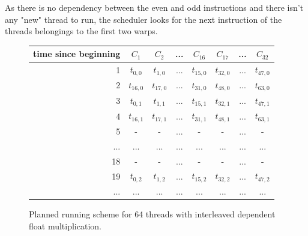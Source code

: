 \documentclass{report}
\begin{document}
As there is no dependency between the even and odd instructions and there isn't any "new" thread to run, the scheduler looks for the next instruction of the threads belongings to the first two warps.
\begin{figure}[H]
      \centering
       \begin{tabular}{ | r || c | c | c | c || c | c | c | }
    	    \hline
    	    time since beginning & $C_1$ & $C_2$ & ... & $C_{16}$ & $C_{17}$ & ... & $C_{32}$ \\ \hline  \hline
    	   1 & $t_{0,0}$ & $t_{1,0}$ & ... & $t_{15,0}$ & $t_{32, 0}$ & ... & $t_{47, 0}$ \\ \hline 
    	   2 & $t_{16,0}$ & $t_{17,0}$ & ... & $t_{31,0}$ & $t_{48, 0}$ & ... & $t_{63, 0}$ \\ \hline
    	   3 & $t_{0,1}$ & $t_{1,1}$ & ... & $t_{15,1}$ & $t_{32, 1}$ & ... & $t_{47, 1}$ \\ \hline
           4 & $t_{16,1}$ & $t_{17,1}$ & ... & $t_{31,1}$ & $t_{48, 1}$ & ... & $t_{63, 1}$ \\ \hline
    	   5 & - & - & ... & - & - & ... & - \\ \hline
    	   ... & ... & ... & ... & ... & ... & ... & ... \\ \hline
    	   18 & - & - & ... & - & - & ... & - \\ \hline
    	   19 & $t_{0,2}$ & $t_{1,2}$ & ... & $t_{15,2}$ & $t_{32,2}$ & ... & $t_{47,2}$ \\ \hline
    	   ... & ... & ... & ... & ... & ... & ... & ... \\ \hline
  	\end{tabular}
  	\captionsetup{justification=centering}
  	\caption{Planned running scheme for 64 threads with interleaved dependent float multiplication.}
  	\label{fig:fp_prediction_64_halfdep}
   \end{figure}
   
   {}
   
\end{document}
